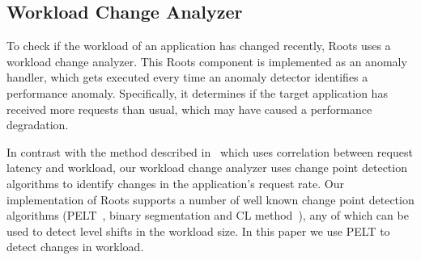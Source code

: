 
\subsection{Workload Change Analyzer}

To check if the workload of an application has changed recently, Roots uses a workload change analyzer.
This Roots component  is implemented as an anomaly handler, which gets executed every time an 
anomaly detector
identifies a performance anomaly. 
Specifically, it determines if the target application has received more requests than usual, which
may have caused a performance degradation.

In contrast with the method described 
in~\cite{Magalhaes:2010:DPA:1906485.1906774,
Magalhaes:2011:RAP:1982185.1982234} which uses correlation between request
latency and workload, our 
workload change analyzer uses change point detection algorithms to 
identify changes in
the application's request rate. 
Our implementation of Roots supports a number of well known change point
detection algorithms (PELT~\cite{doi:10.1080/01621459.2012.737745}, binary segmentation 
and CL method~\cite{chen1993joint}), any of which can be used to detect level shifts in the
workload size.  In this paper we use PELT to detect changes in workload.

